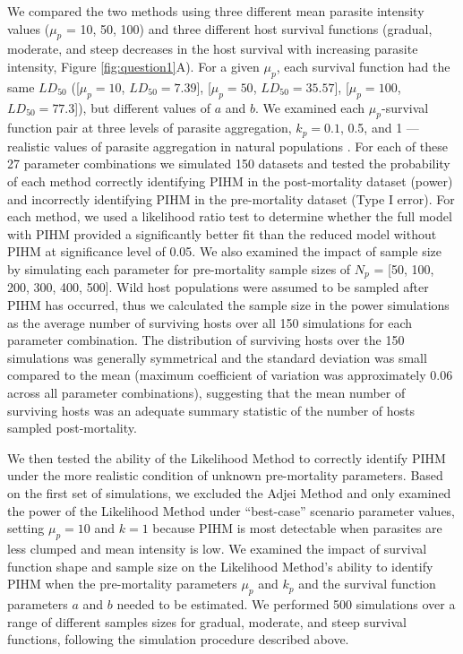 \documentclass[12pt, a4paper]{article}
\begin{document}
We compared the two methods using three different mean parasite intensity values ($\mu_p$ = 10, 50, 100) and three different host survival functions (gradual, moderate, and steep decreases in the host survival with increasing parasite intensity, Figure \ref{fig:question1}A). For a given $\mu_p$, each survival function had the same $LD_{50}$ ([$\mu_p = 10$, $LD_{50} = 7.39$], [$\mu_p = 50$, $LD_{50} = 35.57$], [$\mu_p = 100$, $LD_{50}= 77.3$]),  but different values of $a$ and $b$.  We examined each $\mu_p$-survival function pair at  three levels of parasite
aggregation, $k_p = 0.1$, 0.5, and 1 --- realistic values of parasite aggregation in natural populations \citep{Shaw1998}.  For each of these 27 parameter
combinations we simulated 150 datasets and tested the probability of each method correctly identifying PIHM in the post-mortality dataset (power) and incorrectly identifying PIHM in the pre-mortality dataset (Type I error).  For each method, we used a likelihood ratio test to determine whether the full model with PIHM provided a significantly better fit than the reduced model without PIHM at significance level of 0.05.  We also examined the impact of sample size by simulating each parameter for pre-mortality sample sizes of $N_p$ = [50, 100, 200, 300, 400, 500].  Wild host populations were assumed to be sampled after PIHM has occurred, thus we calculated the sample size in the power simulations as the average number of surviving hosts over all 150 simulations for each parameter combination. The distribution of surviving hosts over the 150 simulations was generally symmetrical and the standard deviation was small compared to the mean (maximum coefficient of variation was approximately 0.06 across all parameter combinations), suggesting that the mean number of surviving hosts was an adequate summary statistic of the number of hosts sampled post-mortality.

We then tested the ability of the Likelihood Method to correctly identify PIHM
under the more realistic condition of unknown pre-mortality parameters. Based
on the first set of simulations, we excluded the Adjei Method and only examined
the power of the Likelihood Method under ``best-case'' scenario parameter
values, setting $\mu_p = 10$ and $k = 1$ because PIHM is most detectable when
parasites are less clumped and mean intensity is low. We examined the impact of survival function shape and
sample size on the Likelihood Method's ability to identify PIHM when the pre-mortality parameters $\mu_p$ and $k_p$ and the survival function parameters $a$
and $b$ needed to be estimated.  We performed 500 simulations over a range of
different samples sizes for gradual, moderate, and steep survival functions, following the simulation procedure described above. \\
\end{document}
